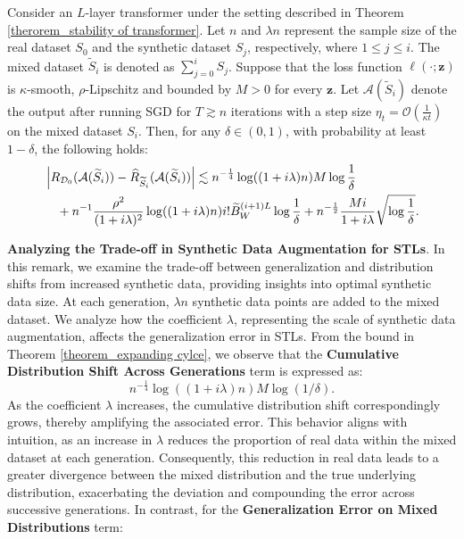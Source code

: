 \begin{theorem}\label{theorem_expanding cylce}
    Consider an $L$-layer transformer under the setting described in Theorem \ref{therorem_stability of transformer}. Let $n$ and $\lambda n$ represent the sample size of the real dataset $S_0$ and the synthetic dataset $S_j$, respectively, where $1 \leq j \leq i$. The mixed dataset $\widetilde{S}_i$ is denoted as $\sum_{j=0}^i S_j$. Suppose that the loss function $\ell(\cdot ; \boldsymbol{z})$ is $\kappa$-smooth, $\rho$-Lipschitz and bounded by $M>0$ for every $\boldsymbol{z}$. Let $\mathcal{A}(\widetilde{S}_i)$ denote the output after running SGD for $T\gtrsim n$ iterations with a step size $\eta_t=\mathcal{O}(\frac{1}{\kappa t})$ on the mixed dataset $S_i$. Then, for any $\delta \in(0,1)$, with probability at least $1-\delta$, the following holds:
\begin{align}
    &\left|R_{\mathcal{D}_0}(\mathcal{A}(\widetilde{S}_i))-\widehat{R}_{\widetilde{S}_i}(\mathcal{A}(\widetilde{S}_i))\right| \lesssim n^{-\frac{1}{4}}\log ((1+i\lambda)n)M\log\frac{1}{\delta}\notag \\
    &\quad+ n^{-1}\frac{\rho^2}{(1+i\lambda)^2} \log ((1+i\lambda) n)i!\widetilde{B}_W^{(i+1) L}\log\frac{1}{\delta}+n^{-\frac{1}{2}}\frac{Mi}{1+i\lambda} \sqrt{\log\frac{1}{\delta}}. \notag
\end{align}
\begin{remark}\textbf{Analyzing the Trade-off in Synthetic Data Augmentation for STLs}. In this remark, we examine the trade-off between generalization and distribution shifts from increased synthetic data, providing insights into optimal synthetic data size. At each generation, $\lambda n$ synthetic data points are added to the mixed dataset. We analyze how the coefficient $\lambda$, representing the scale of synthetic data augmentation, affects the generalization error in STLs. From the bound in Theorem \ref{theorem_expanding cylce}, we observe that the \textbf{Cumulative Distribution Shift Across Generations} term is expressed as:
$$
n^{-\frac{1}{4}} \log ((1+i \lambda) n) M \log (1/\delta).
$$
As the coefficient $\lambda$ increases, the cumulative distribution shift correspondingly grows, thereby amplifying the associated error. This behavior aligns with intuition, as an increase in $\lambda$ reduces the proportion of real data within the mixed dataset at each generation. Consequently, this reduction in real data leads to a greater divergence between the mixed distribution and the true underlying distribution, exacerbating the deviation and compounding the error across successive generations. In contrast, for the \textbf{Generalization Error on Mixed Distributions} term:

\end{remark}
\end{theorem}
